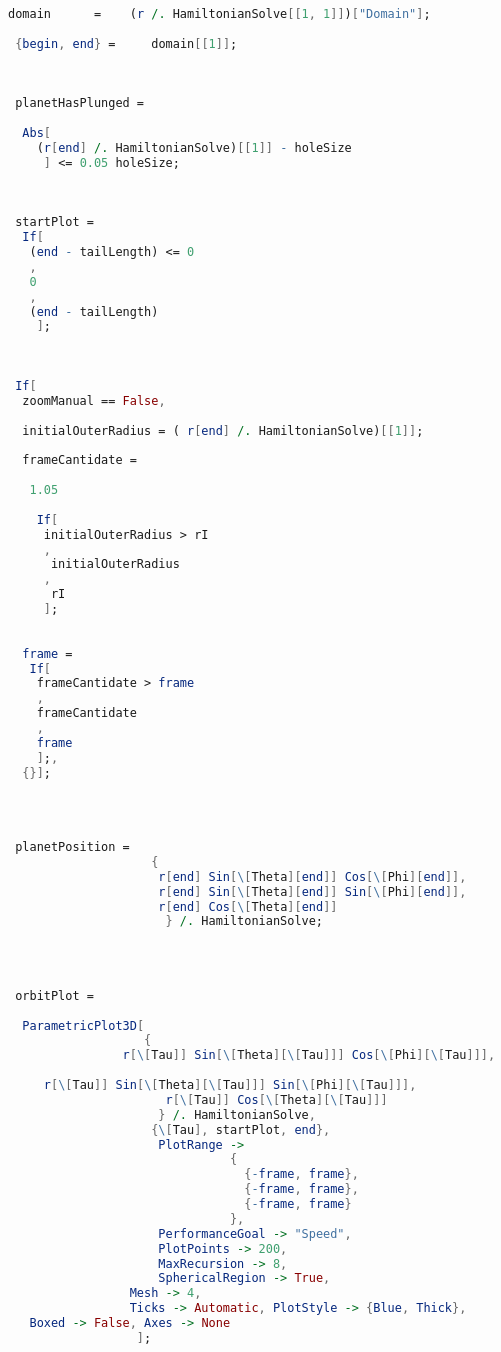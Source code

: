 \begin{lstlisting}[language=Mathematica,stepnumber=1,]
   domain      =    (r /. HamiltonianSolve[[1, 1]])["Domain"];
 
 {begin, end} =     domain[[1]];
 
 
 
 planetHasPlunged = 
  
  Abs[
    (r[end] /. HamiltonianSolve)[[1]] - holeSize
     ] <= 0.05 holeSize;
   
 
 
 startPlot =
  If[
   (end - tailLength) <= 0
   ,
   0
   ,
   (end - tailLength)
    ];
 
 
 
 If[
  zoomManual == False,
  
  initialOuterRadius = ( r[end] /. HamiltonianSolve)[[1]];
  
  frameCantidate =
   
   1.05
    
    If[
     initialOuterRadius > rI
     ,
      initialOuterRadius
     ,
      rI
     ];
  
  
  frame =
   If[
    frameCantidate > frame
    ,
    frameCantidate
    ,
    frame
    ];,
  {}];
 
 
 
 
 planetPosition =      
                    {
                     r[end] Sin[\[Theta][end]] Cos[\[Phi][end]],
                     r[end] Sin[\[Theta][end]] Sin[\[Phi][end]],
                     r[end] Cos[\[Theta][end]]
                      } /. HamiltonianSolve;
 
 
 
 
 orbitPlot =
  
  ParametricPlot3D[
                   { 
                r[\[Tau]] Sin[\[Theta][\[Tau]]] Cos[\[Phi][\[Tau]]],
                      
     r[\[Tau]] Sin[\[Theta][\[Tau]]] Sin[\[Phi][\[Tau]]],
                      r[\[Tau]] Cos[\[Theta][\[Tau]]]
                     } /. HamiltonianSolve,
                    {\[Tau], startPlot, end},
                     PlotRange ->
                               {
                                 {-frame, frame},
                                 {-frame, frame},
                                 {-frame, frame}
                               },
                     PerformanceGoal -> "Speed",
                     PlotPoints -> 200,
                     MaxRecursion -> 8,
                     SphericalRegion -> True,
                 Mesh -> 4,
                 Ticks -> Automatic, PlotStyle -> {Blue, Thick}, 
   Boxed -> False, Axes -> None
                  ];
 

\end{lstlisting}
